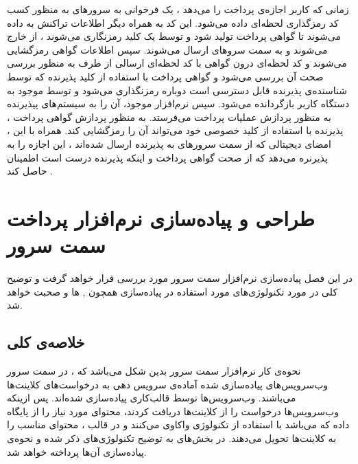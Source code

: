 \documentclass[oneside]{report}
\begin{document}
  زمانی که کاربر اجازه‌ی پرداخت را می‌دهد ، یک فرخوانی به سرورهای 
  {\normalsize {}} 
  به منظور کسب کد رمزگذاری لحظه‌ای 
     داده می‌شود. این کد به همراه دیگر اطلاعات تراکنش به 
      {\normalsize {}} 
      داده می‌شوند تا گواهی پرداخت 
      تولید شود و توسط یک کلید 
       {\normalsize {}} 
    رمزنگاری می‌شوند ، از 
     {\normalsize {}} 
     خارج می‌شوند 
    و به سمت سروهای 
     {\normalsize {}} 
     ارسال می‌شوند. سپس اطلاعات گواهی رمزگشایی می‌شوند و کد لحظه‌ای درون گواهی با کد لحظه‌ای ارسالی از طرف 
          {\normalsize {}} 
    به منظور بررسی صحت آن بررسی می‌شود و گواهی پرداخت با استفاده از کلید پذیرنده که توسط شناسنده‌ی پذیرنده قابل دسترسی است دوباره رمزنگذاری می‌شود و  توسط 
         {\normalsize {}} 
         موجود به دستگاه کاربر بازگردانده می‌شود.  سپس نرم‌افزار موجود، آن را به سیستم‌های پیذیرنده به منظور پردازش عملیات پرداخت می‌فرستد. به منظور پردازش گواهی پرداخت ، پذیرنده با استفاده از کلید خصوصی 
         خود می‌تواند آن را رمزگشایی کند. همراه با این ، امضای دیجیتالی که از سمت سرورهای 
         {\normalsize {}} 
                به پذیرنده ارسال شده‌اند ، این اجازه را به پذیرنره می‌دهد که از صحت گواهی پرداخت و اینکه پذیرنده درست است اطمینان حاصل کند .      
      \cite{iossecurity}
               
               
 
		
		
		\chapter{طراحی و پیاده‌سازی نرم‌افزار پرداخت سمت سرور}\label{serverimplementation}
در این فصل پیاده‌سازی نرم‌افزار سمت سرور 
 مورد بررسی قرار خواهد گرفت و توضیح کلی در مورد تکنولوژی‌های مورد استفاده در پیاده‌سازی همچون 
         {\normalsize {}}
         , 
                  {\normalsize {}} ها
                  و 
                           {\normalsize {}}
                              صحبت خواهد شد. 
                              
   \section{خلاصه‌ی کلی}                
  نحوه‌ی کار نرم‌افزار سمت سرور بدین شکل می‌باشد که ، در سمت سرور وب‌سرویس‌های پیاده‌سازی شده 
  آماده‌ی سرویس دهی به درخواست‌های کلاینت‌ها می‌باشند. وب‌سرویس‌ها توسط قالب‌کاری 
           {\normalsize {}} 
   پیاده‌سازی شده‌اند. پس ازینکه وب‌سرویس‌ها درخواست را از کلاینت‌ها دریافت کردند، 
   محتوای مورد نیاز را از پایگاه داده که 
            {\normalsize {}} 
            می‌باشد با استفاده از تکنولوژی                                     
                     {\normalsize {}} 
واکاوی می‌کنند و در قالب
         {\normalsize {}} 
        ، محتوای مناسب را به کلاینت‌ها تحویل می‌دهند. 
		در بخش‌های به توضیح تکنولوژی‌های ذکر شده و نحوه‌ی پیاده‌سازی آن‌ها پرداخته خواهد شد.
		
\end{document}
